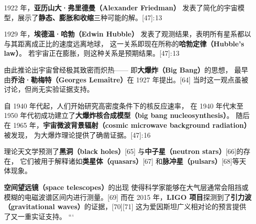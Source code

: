 1922 年，\textbf{亚历山大·弗里德曼（Alexander Friedman）}  
发表了简化的宇宙模型，展示了\textbf{静态、膨胀和收缩}三种可能的解。[47]: 13   

1929 年，\textbf{埃德温·哈勃（Edwin Hubble）}  
发表了观测结果，表明所有星系都以与其距离成正比的速度远离地球，  
这一关系即现在所称的\textbf{哈勃定律（Hubble’s law）}。  
若宇宙正在膨胀，则这种关系是预期结果。[47]: 13   

由此推论出宇宙曾经极其致密而炽热——  
即\textbf{大爆炸（Big Bang）}的思想，  
最早由\textbf{乔治·勒梅特（Georges Lemaître）}在 1927 年提出。[64]  
当时这一观点虽被讨论，但尚无实验证据支持。  

自 1940 年代起，人们开始研究高密度条件下的核反应速率，  
在 1940 年代末至 1950 年代初成功建立了\textbf{大爆炸核合成模型（big bang nucleosynthesis）}。  
随后在 1965 年，\textbf{宇宙微波背景辐射（cosmic microwave background radiation）}被发现，  
为大爆炸理论提供了确凿证据。[47]: 16   

理论天文学预测了\textbf{黑洞（black holes）}[65]  
与\textbf{中子星（neutron stars）}[66]的存在，  
它们被用于解释诸如\textbf{类星体（quasars）}[67]  
和\textbf{脉冲星（pulsars）}[68]等天体现象。  

\textbf{空间望远镜（space telescopes）}的出现  
使得科学家能够在大气层通常会阻挡或模糊的电磁波谱区间内进行测量。[69]  
而在 2015 年，\textbf{LIGO 项目}探测到了\textbf{引力波（gravitational waves）}的证据，[70][71]  
这为爱因斯坦广义相对论的预言提供了又一重实证支持。
```
